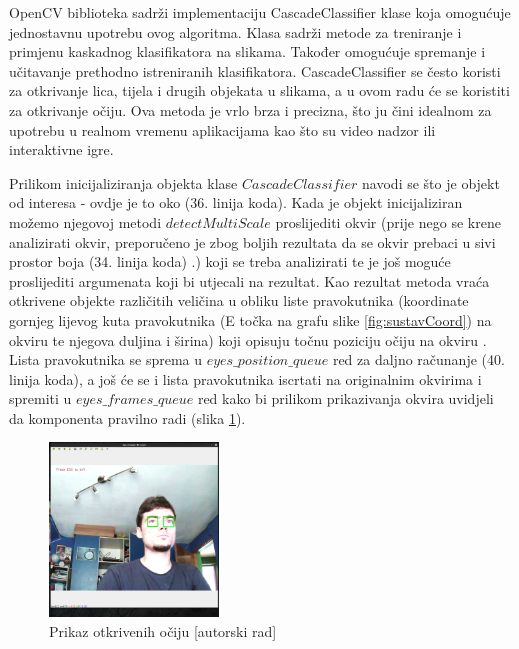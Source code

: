 \documentclass{foi}
\begin{document}
\newpage
OpenCV biblioteka sadrži implementaciju CascadeClassifier klase koja omogućuje jednostavnu upotrebu ovog algoritma. Klasa sadrži metode za treniranje i primjenu kaskadnog klasifikatora na slikama. Također omogućuje spremanje i učitavanje prethodno istreniranih klasifikatora. CascadeClassifier se često koristi za otkrivanje lica, tijela i drugih objekata u slikama, a u ovom radu će se koristiti za otkrivanje očiju. Ova metoda je vrlo brza i precizna, što ju čini idealnom za upotrebu u realnom vremenu aplikacijama kao što su video nadzor ili interaktivne igre. \cite{OpenCV5}

Prilikom inicijaliziranja objekta klase $CascadeClassifier$ navodi se što je objekt od interesa - ovdje je to oko (36. linija koda). Kada je objekt inicijaliziran možemo njegovoj metodi $detectMultiScale$ proslijediti okvir (prije nego se krene analizirati okvir, preporučeno je zbog boljih rezultata da se okvir prebaci u sivi prostor boja (34. linija koda) \cite{OpenCV5}.) koji se treba analizirati te je još moguće proslijediti argumenata koji bi utjecali na rezultat. Kao rezultat metoda vraća otkrivene objekte različitih veličina u obliku liste pravokutnika (koordinate gornjeg lijevog kuta pravokutnika (E točka na grafu slike \ref{fig:sustavCoord}) na okviru te njegova duljina i širina) koji opisuju točnu poziciju očiju na okviru \cite{OpenCV6}. Lista pravokutnika se sprema u $eyes\_position\_queue$ red za daljno računanje (40. linija koda), a još će se i lista pravokutnika iscrtati na originalnim okvirima i spremiti u $eyes\_frames\_queue$ red kako bi prilikom prikazivanja okvira uvidjeli da komponenta pravilno radi (slika \ref{fig:sustav3}).

\begin{figure}[h!]
    \centering
    \includegraphics[width=0.4\textwidth]{slike/sustav3}
    \caption{Prikaz otkrivenih očiju [autorski rad]}
    \label{fig:sustav3}
\end{figure}
\end{document}
